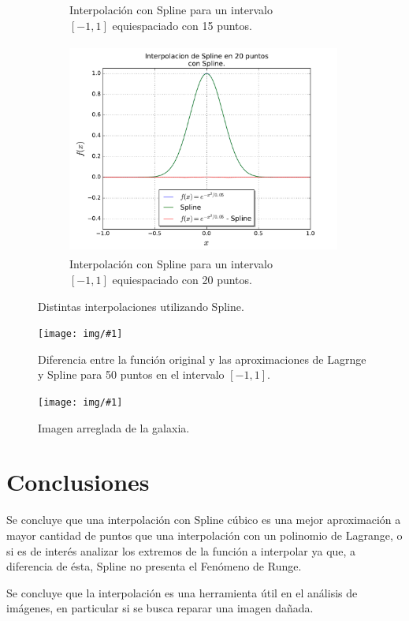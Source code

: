 \documentclass[a4paper, 11pt, spanish]{article}
\newcommand{\fig}[4]{%
	\begin{figure}[!htbp]
		\centering
		\texttt{[image: img/\#1]}
		\caption{#4}
	\end{figure}
}
\begin{document}
\begin{figure}[!hbpt]
\begin{subfigure}{.5\textwidth}
  \caption{Interpolaci\'on con Spline para un intervalo\\ $[-1,1]$ equiespaciado con 15 puntos.}
\end{subfigure}%
\begin{subfigure}{.5\textwidth}
  \centering
  \includegraphics[width=9cm, height=7cm]{img/spline20.pdf}
  \caption{Interpolaci\'on con Spline para un intervalo\\ $[-1,1]$ equiespaciado con 20 puntos.}
\end{subfigure}
\caption{Distintas interpolaciones utilizando Spline.}
\end{figure}

\fig{lagrange_spl_diff.pdf}{18cm}{13cm}{Diferencia entre la funci\'on original y las aproximaciones de Lagrnge y Spline para 50 puntos en el intervalo $[-1, 1]$.}
\fig{fixed_galaxy.pdf}{18cm}{13cm}{Imagen arreglada de la galaxia.}

\newpage

\section{Conclusiones}
Se concluye que una interpolaci\'on con Spline c\'ubico es una mejor aproximaci\'on a mayor cantidad de puntos que una interpolaci\'on con un polinomio de Lagrange, o si es de inter\'es analizar los extremos de la funci\'on a interpolar ya que, a diferencia de \'esta, Spline no presenta el Fen\'omeno de Runge.

Se concluye que la interpolaci\'on es una herramienta \'util en el an\'alisis de im\'agenes, en particular si se busca reparar una imagen da\~nada.
\end{document}
